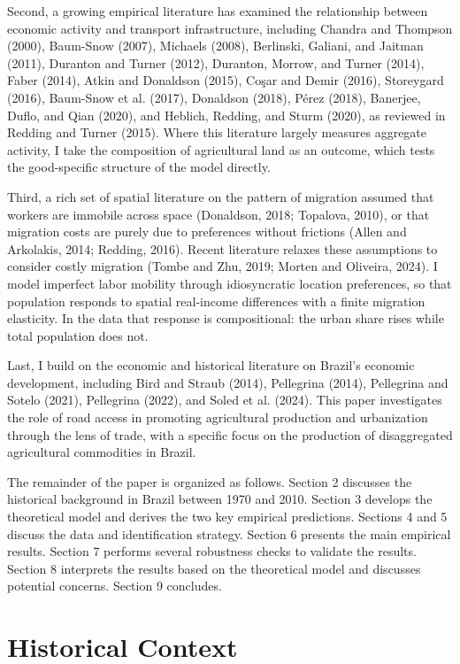 \documentclass[11pt]{article}
\begin{document}
Second, a growing empirical literature has examined the relationship between economic activity and transport infrastructure, including Chandra and Thompson (2000), Baum-Snow (2007), Michaels (2008), Berlinski, Galiani, and Jaitman (2011), Duranton and Turner (2012), Duranton, Morrow, and Turner (2014), Faber (2014), Atkin and Donaldson (2015), Coşar and Demir (2016), Storeygard (2016), Baum-Snow et al. (2017), Donaldson (2018), Pérez (2018), Banerjee, Duflo, and Qian (2020), and Heblich, Redding, and Sturm (2020), as reviewed in Redding and Turner (2015). Where this literature largely measures aggregate activity, I take the composition of agricultural land as an outcome, which tests the good-specific structure of the model directly.

Third, a rich set of spatial literature on the pattern of migration assumed that workers are immobile across space (Donaldson, 2018; Topalova, 2010), or that migration costs are purely due to preferences without frictions (Allen and Arkolakis, 2014; Redding, 2016). Recent literature relaxes these assumptions to consider costly migration (Tombe and Zhu, 2019; Morten and Oliveira, 2024). I model imperfect labor mobility through idiosyncratic location preferences, so that population responds to spatial real-income differences with a finite migration elasticity. In the data that response is compositional: the urban share rises while total population does not.

Last, I build on the economic and historical literature on Brazil's economic development, including Bird and Straub (2014), Pellegrina (2014), Pellegrina and Sotelo (2021), Pellegrina (2022), and Soled et al. (2024). This paper investigates the role of road access in promoting agricultural production and urbanization through the lens of trade, with a specific focus on the production of disaggregated agricultural commodities in Brazil.

The remainder of the paper is organized as follows. Section 2 discusses the historical background in Brazil between 1970 and 2010. Section 3 develops the theoretical model and derives the two key empirical predictions. Sections 4 and 5 discuss the data and identification strategy. Section 6 presents the main empirical results. Section 7 performs several robustness checks to validate the results. Section 8 interprets the results based on the theoretical model and discusses potential concerns. Section 9 concludes.

\section{Historical Context}
\end{document}
